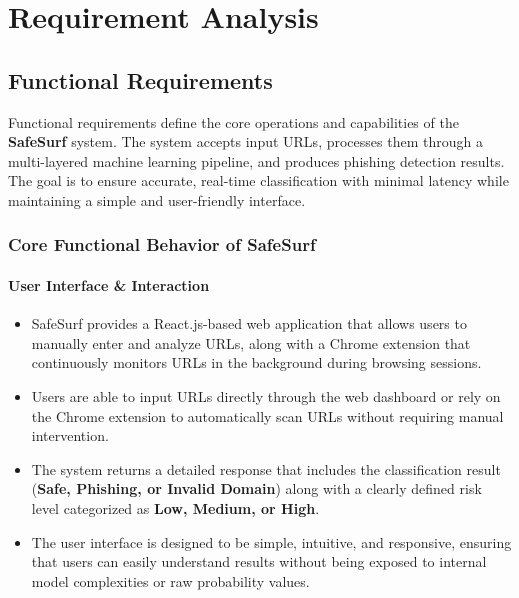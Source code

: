 \chapter{Requirement Analysis}

\section{Functional Requirements}

Functional requirements define the core operations and capabilities of the \textbf{SafeSurf} system. The system accepts input URLs, processes them through a multi-layered machine learning pipeline, and produces phishing detection results. The goal is to ensure accurate, real-time classification with minimal latency while maintaining a simple and user-friendly interface.

\subsection{Core Functional Behavior of SafeSurf}

\subsubsection*{User Interface \& Interaction}

\begin{itemize}
    \item SafeSurf provides a React.js-based web application that allows users to manually enter and analyze URLs, along with a Chrome extension that continuously monitors URLs in the background during browsing sessions.
    
    \item Users are able to input URLs directly through the web dashboard or rely on the Chrome extension to automatically scan URLs without requiring manual intervention.
    
    \item The system returns a detailed response that includes the classification result (\textbf{Safe, Phishing, or Invalid Domain}) along with a clearly defined risk level categorized as \textbf{Low, Medium, or High}.
    
    \item The user interface is designed to be simple, intuitive, and responsive, ensuring that users can easily understand results without being exposed to internal model complexities or raw probability values.
\end{itemize}

